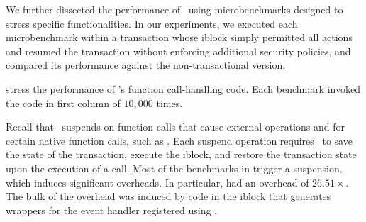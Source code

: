 %
We further dissected the performance of \txjs\ using microbenchmarks designed
to stress specific functionalities.
In
our experiments, we executed each microbenchmark within a transaction whose
iblock simply permitted all actions and resumed the transaction without
enforcing additional security policies, and compared its performance against the
non-transactional version.

%
stress the performance of \txjs's function call-handling code. Each benchmark
invoked the code in first column of 
$10,000$ times.

Recall that \txjs\ suspends on function calls that cause external operations
and for certain native function calls, such as . Each suspend
operation requires \txjs\ to save the state of the transaction, execute the
iblock, and restore the transaction state upon the execution of a 
call. Most of the benchmarks in  trigger a
suspension, which induces significant overheads. In particular,
 had an overhead of $26.51\times$. The bulk of the
overhead was induced by code in the iblock that generates wrappers for the
event handler registered using .
%
%


